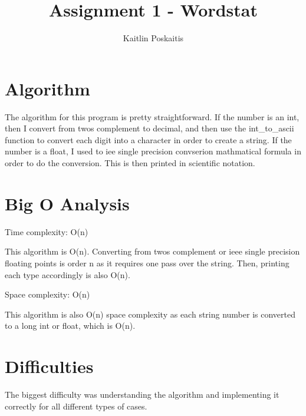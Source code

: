\documentclass[11pt]{article}
\title{\bf Assignment 1 - Wordstat}
\author{Kaitlin Poskaitis}
\date{}
\begin{document}
\maketitle

\section*{Algorithm}

The algorithm for this program is pretty straightforward. If the number is
an int, then I convert from twos complement to decimal, and then use the 
int\_to\_ascii function to convert each digit into a character in order to 
create a string. If the number is a float, I used to iee single precision 
convserion mathmatical formula in order to do the conversion. This is then 
printed in scientific notation.

\section*{Big O Analysis}

Time complexity: O(n)

This algorithm is O(n). Converting from twos complement or ieee single
precision floating points is order n as it requires one pass over the string.
Then, printing each type accordingly is also O(n).

Space complexity: O(n)

This algorithm is also O(n) space complexity as each string number is converted 
to a long int or float, which is O(n).


\section*{Difficulties}

The biggest difficulty was understanding the algorithm and implementing it 
correctly for all different types of cases.
\end{document}
